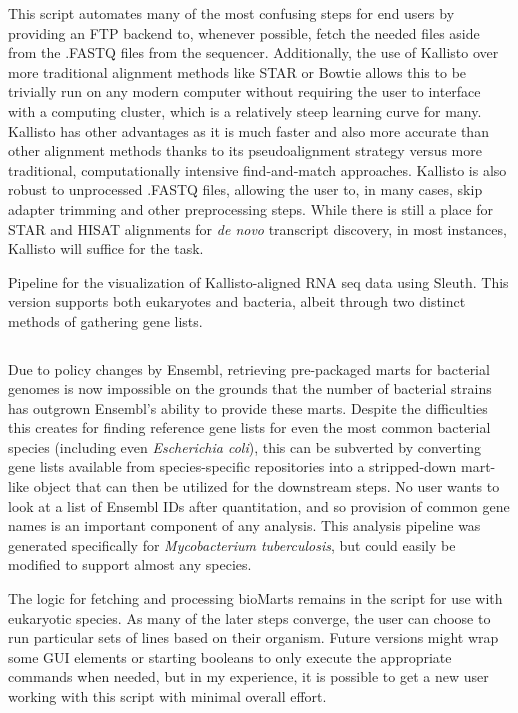This script automates many of the most confusing steps for end users by providing an FTP backend to, whenever possible, fetch the needed files aside from the .FASTQ files from the sequencer. Additionally, the use of Kallisto over more traditional alignment methods like STAR or Bowtie allows this to be trivially run on any modern computer without requiring the user to interface with a computing cluster, which is a relatively steep learning curve for many. Kallisto has other advantages as it is much faster and also more accurate than other alignment methods thanks to its pseudoalignment strategy versus more traditional, computationally intensive find\hyp{}and\hyp{}match approaches. Kallisto is also robust to unprocessed .FASTQ files, allowing the user to, in many cases, skip adapter trimming and other preprocessing steps. While there is still a place for STAR and HISAT alignments for \textit{de novo} transcript discovery, in most instances, Kallisto will suffice for the task. 

\begin{code}
\caption{Pipeline for the visualization of Kallisto\hyp{}aligned RNA seq data using Sleuth. This version supports both eukaryotes and bacteria, albeit through two distinct methods of gathering gene lists.}
\label{blinder}

\inputminted[breaklines,frame=single,fontsize=\small]{r}{source/sleuther.R}

\end{code}

Due to policy changes by Ensembl, retrieving pre\hyp{}packaged marts for bacterial genomes is now impossible on the grounds that the number of bacterial strains has outgrown Ensembl's ability to provide these marts. Despite the difficulties this creates for finding reference gene lists for even the most common bacterial species (including even \textit{Escherichia coli}), this can be subverted by converting gene lists available from species\hyp{}specific repositories into a stripped\hyp{}down mart\hyp{}like object that can then be utilized for the downstream steps. No user wants to look at a list of Ensembl IDs after quantitation, and so provision of common gene names is an important component of any analysis. This analysis pipeline was generated specifically for \textit{Mycobacterium tuberculosis}, but could easily be modified to support almost any species.

The logic for fetching and processing bioMarts remains in the script for use with eukaryotic species. As many of the later steps converge, the user can choose to run particular sets of lines based on their organism. Future versions might wrap some GUI elements or starting booleans to only execute the appropriate commands when needed, but in my experience, it is possible to get a new user working with this script with minimal overall effort.

